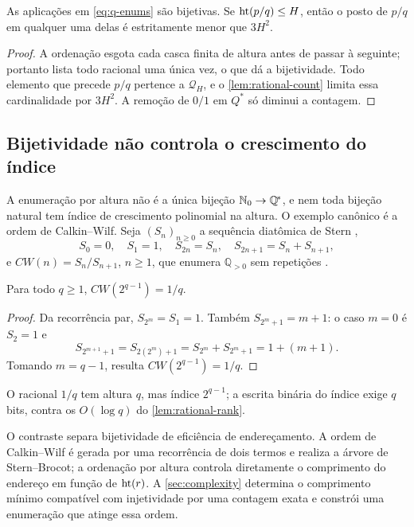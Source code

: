 \begin{lemma}\label{lem:rational-rank}
As aplicações em \eqref{eq:q-enums} são bijetivas. Se $\operatorname{ht}(p/q)\le H$, então o posto de $p/q$ em qualquer uma delas é estritamente menor que $3H^2$.
\end{lemma}

\begin{proof}
A ordenação esgota cada casca finita de altura antes de passar à seguinte; portanto lista todo racional uma única vez, o que dá a bijetividade. Todo elemento que precede $p/q$ pertence a $\mathcal{Q}_H$, e o \cref{lem:rational-count} limita essa cardinalidade por $3H^2$. A remoção de $0/1$ em $Q^{\!*}$ só diminui a contagem.
\end{proof}

\subsection{Bijetividade não controla o crescimento do índice}
\label{sec:cw}

A enumeração por altura não é a única bijeção $\mathbb{N}_0\to\mathbb{Q}^{\!*}$, e nem toda bijeção natural tem índice de crescimento polinomial na altura. O exemplo canônico é a ordem de Calkin--Wilf. Seja $(S_n)_{n\ge0}$ a sequência diatômica de Stern \citep{stern1858,northshield2010},
\begin{equation}
 S_0=0,\quad S_1=1,\quad S_{2n}=S_n,\quad S_{2n+1}=S_n+S_{n+1},
\end{equation}
e $CW(n)=S_n/S_{n+1}$, $n\ge1$, que enumera $\mathbb{Q}_{>0}$ sem repetições \citep{calkin2000}.

\begin{lemma}\label{lem:cw}
Para todo $q\ge1$, $CW(2^{q-1})=1/q$.
\end{lemma}

\begin{proof}
Da recorrência par, $S_{2^m}=S_1=1$. Também $S_{2^m+1}=m+1$: o caso $m=0$ é $S_2=1$ e
\[
 S_{2^{m+1}+1}=S_{2(2^m)+1}=S_{2^m}+S_{2^m+1}=1+(m+1).
\]
Tomando $m=q-1$, resulta $CW(2^{q-1})=1/q$.
\end{proof}

O racional $1/q$ tem altura $q$, mas índice $2^{q-1}$; a escrita binária do índice exige $q$ bits, contra os $O(\log q)$ do \cref{lem:rational-rank}.

O contraste separa bijetividade de eficiência de endereçamento. A ordem de Calkin--Wilf é gerada por uma recorrência de dois termos e realiza a árvore de Stern--Brocot; a ordenação por altura controla diretamente o comprimento do endereço em função de $\operatorname{ht}(r)$. A \cref{sec:complexity} determina o comprimento mínimo compatível com injetividade por uma contagem exata e constrói uma enumeração que atinge essa ordem.

